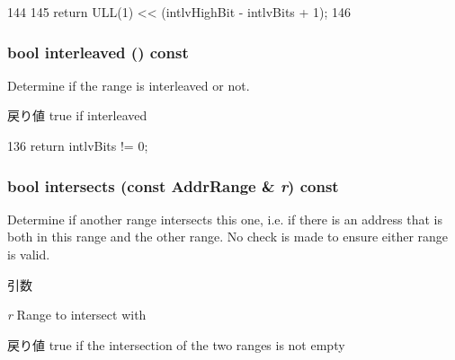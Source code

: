 \begin{DoxyCode}
144     {
145         return ULL(1) << (intlvHighBit - intlvBits + 1);
146     }
\end{DoxyCode}
\hypertarget{classAddrRange_a5d52a3406dc6afea475c78ce06508afa}{
\subsubsection[{interleaved}]{\setlength{\rightskip}{0pt plus 5cm}bool interleaved () const}}
\label{classAddrRange_a5d52a3406dc6afea475c78ce06508afa}
Determine if the range is interleaved or not.

\begin{DoxyReturn}{戻り値}
true if interleaved 
\end{DoxyReturn}



\begin{DoxyCode}
136 { return intlvBits != 0; }
\end{DoxyCode}
\hypertarget{classAddrRange_af078c7e4b8ad8c7f3666ebb2fef613da}{
\subsubsection[{intersects}]{\setlength{\rightskip}{0pt plus 5cm}bool intersects (const {\bf AddrRange} \& {\em r}) const}}
\label{classAddrRange_af078c7e4b8ad8c7f3666ebb2fef613da}
Determine if another range intersects this one, i.e. if there is an address that is both in this range and the other range. No check is made to ensure either range is valid.


\begin{DoxyParams}{引数}
\item[{\em r}]Range to intersect with \end{DoxyParams}
\begin{DoxyReturn}{戻り値}
true if the intersection of the two ranges is not empty 
\end{DoxyReturn}




